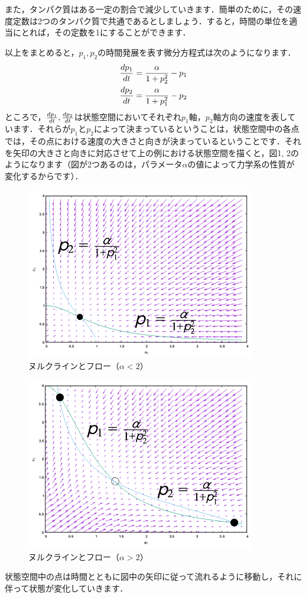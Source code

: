 \documentclass[platex,dvipdfmx, a5paper]{jlreq}			%
\begin{document}
また，タンパク質はある一定の割合で減少していきます．簡単のために，その速度定数は2つのタンパク質で共通であるとしましょう．すると，時間の単位を適当にとれば，その定数を1にすることができます．

以上をまとめると，$p_1, p_2$の時間発展を表す微分方程式は次のようになります．
\begin{align}
\dv{p_1}{t} &= \frac{\alpha}{1 + p_2^2} - p_1 \label{f1} \\
\dv{p_2}{t} &= \frac{\alpha}{1 + p_1^2} - p_2 \label{f2}
\end{align}
ところで，$\dv{p_1}{t}, \dv{p_2}{t}$は状態空間においてそれぞれ$p_1$軸，$p_2$軸方向の速度を表しています．それらが$p_1$と$p_2$によって決まっているということは，状態空間中の各点では，その点における速度の大きさと向きが決まっているということです．それを矢印の大きさと向きに対応させて上の例における状態空間を描くと，図1, 2のようになります（図が2つあるのは，パラメータ$\alpha$の値によって力学系の性質が変化するからです）．
\begin{figure}[H]
 \centering
   \includegraphics[width=100mm]{figures/a.png}
   \caption{ヌルクラインとフロー（$\alpha < 2$）}
\end{figure}
\begin{figure}[H]
 \centering
   \includegraphics[width=100mm]{figures/b.png}
   \caption{ヌルクラインとフロー（$\alpha > 2$）}
\end{figure}
状態空間中の点は時間とともに図中の矢印に従って流れるように移動し，それに伴って状態が変化していきます．
\end{document}

